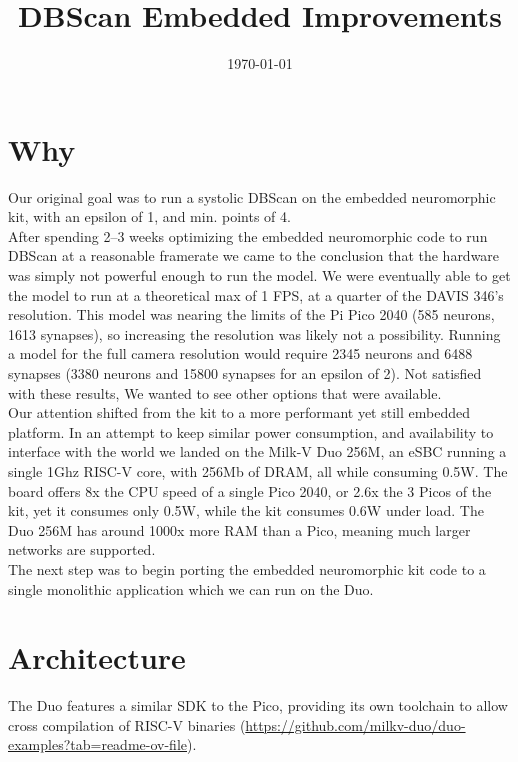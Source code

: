 \documentclass[conference]{IEEEtran}{}
\date{\today}
\title{DBScan Embedded Improvements}
\begin{document}
\maketitle
\section{Why}
\label{sec:orgc00807b}
Our original goal was to run a systolic DBScan on the embedded neuromorphic kit, with an epsilon of 1, and min. points of 4.\\

After spending 2–3 weeks optimizing the embedded neuromorphic code to run DBScan at a reasonable framerate we came to the conclusion that the hardware was simply not powerful enough to run the model. We were eventually able to get the model to run at a theoretical max of 1 FPS, at a quarter of the DAVIS 346's resolution. This model was nearing the limits of the Pi Pico 2040 (585 neurons, 1613 synapses), so increasing the resolution was likely not a possibility. Running a model for the full camera resolution would require 2345 neurons and 6488 synapses (3380 neurons and 15800 synapses for an epsilon of 2). Not satisfied with these results, We wanted to see other options that were available.\\

Our attention shifted from the kit to a more performant yet still embedded platform. In an attempt to keep similar power consumption, and availability to interface with the world we landed on the Milk-V Duo 256M, an eSBC running a single 1Ghz RISC-V core, with 256Mb of DRAM, all while consuming 0.5W. The board offers 8x the CPU speed of a single Pico 2040, or 2.6x the 3 Picos of the kit, yet it consumes only 0.5W, while the kit consumes 0.6W under load. The Duo 256M has around 1000x more RAM than a Pico, meaning much larger networks are supported.\\

The next step was to begin porting the embedded neuromorphic kit code to a single monolithic application which we can run on the Duo.\\
\section{Architecture}
\label{sec:orgc2bf5e4}
The Duo features a similar SDK to the Pico, providing its own toolchain to allow cross compilation of RISC-V binaries (\url{https://github.com/milkv-duo/duo-examples?tab=readme-ov-file}).\\
\end{document}
